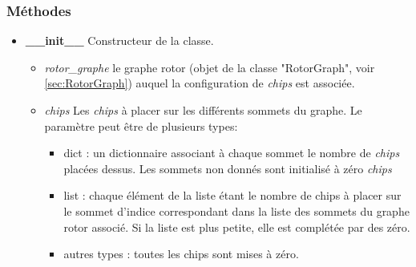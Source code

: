 \documentclass{article}
\begin{document}
	\subsubsection{Méthodes}
	\begin{itemize}
		\item \textbf{\_\_init\_\_}\newline
		Constructeur de la classe.
		\begin{itemize}
			\item \textit{rotor\_graphe}\newline
			le graphe rotor (objet de la classe "RotorGraph", voir \ref{sec:RotorGraph}) auquel la configuration de \textit{chips} est associée.
			\item \textit{chips}\newline
			Les \textit{chips} à placer sur les différents sommets du graphe. Le paramètre peut être de plusieurs types:
			\begin{itemize}
				\item dict : un dictionnaire associant à chaque sommet le nombre de \textit{chips} placées dessus. Les sommets non donnés sont initialisé à zéro \textit{chips}
				\item list : chaque élément de la liste étant le nombre de chips à placer sur le sommet d'indice correspondant dans la liste des sommets du graphe rotor associé. Si la liste est plus petite, elle est complétée par des zéro.
				\item autres types : toutes les chips sont mises à zéro.
			\end{itemize}
		\end{itemize}
	\end{itemize}
	
\end{document}
